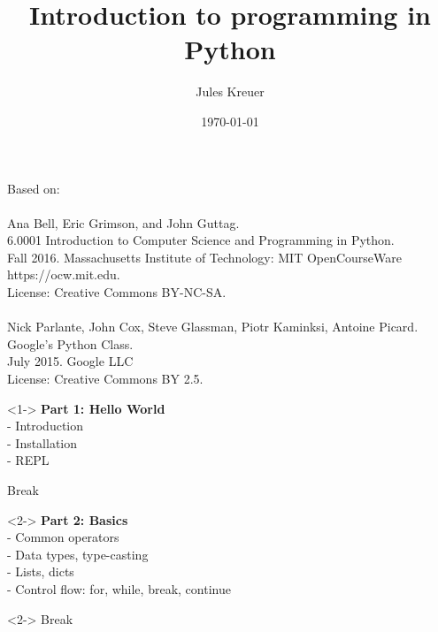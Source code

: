 \documentclass{beamer}
\title[]{Introduction to programming in Python} %
\author{Jules Kreuer} %
\institute[FSI] %
{
Uni Tübingen\\ %
\medskip
\textit{fsi@fsi.uni-tuebingen.de}\\
\textit{contact@juleskreuer.eu}\\
}
\date{\today} %
\begin{document}
\begin{frame}
\titlepage %
\end{frame}


\begin{frame}
	Based on:\\\\
	Ana Bell, Eric Grimson, and John Guttag. \\
	6.0001 Introduction to Computer Science and Programming in Python.\\
	Fall 2016. Massachusetts Institute of Technology: MIT OpenCourseWare\\
	https://ocw.mit.edu.\\
	License: Creative Commons BY-NC-SA.\\\\
	
	Nick Parlante, John Cox, Steve Glassman, Piotr Kaminksi, Antoine Picard.\\
	Google's Python Class.\\
	July 2015. Google LLC\\
	License: Creative Commons BY 2.5.	
\end{frame}

\begin{frame}
	\begin{block}{}<1->
		\textbf{Part 1: Hello World}\\
		- Introduction\\ 
		- Installation \\
		- REPL\\
	\end{block}
	\begin{exampleblock}{}
	Break
	\end{exampleblock}
	\begin{block}{}<2->
	\textbf{Part 2: Basics}\\
	- Common operators\\
	- Data types, type-casting\\
	- Lists, dicts\\
	- Control flow: for, while, break, continue\\
	\end{block}
	\begin{exampleblock}{}<2->
		Break
	\end{exampleblock}
\end{frame}
\end{document}
